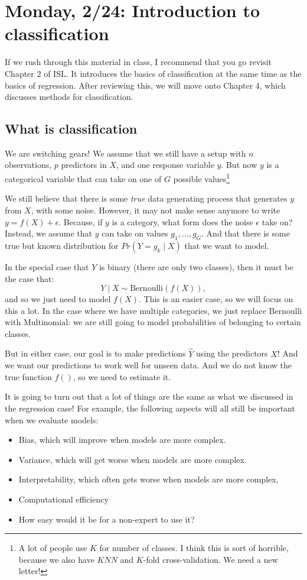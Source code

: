 \section{Monday, 2/24: Introduction to classification}

If we rush through this material in class, I recommend that you go revisit Chapter 2 of ISL. It introduces the basics of classification at the same time as the basics of regression. After reviewing this, we will move onto Chapter 4, which discusses methods for classification.

\subsection{What is classification}

We are switching gears! We assume that we still have a setup with $n$ observations, $p$ predictors in $X$, and one response variable $y$. But now $y$ is a categorical variable that can take on one of $G$ possible values\footnote{A lot of people use $K$ for number of classes. I think this is sort of horrible, because we also have $KNN$ and $K$-fold cross-validation. We need a new letter!}

We still believe that there is some \emph{true} data generating process that generates $y$ from $X$, with some noise. However, it may not make sense anymore to write $y = f(X) + \epsilon$. Because, if $y$ is a category, what form does the noise $\epsilon$ take on? Instead, we assume that $y$ can take on values $g_1,\ldots, g_G$. And that there is some true but known distribution for $Pr(Y=g_k \mid X)$ that we want to model. 

In the special case that $Y$ is binary (there are only two classes), then it must be the case that:
$$
Y \mid X \sim \mathrm{Bernoulli}(f(X)), 
$$
and so we just need to model $f(X)$. This is an easier case, so we will focus on this a lot. In the case where we have multiple categories, we just replace $\mathrm{Bernoulli}$ with $\mathrm{Multinomial}$: we are still going to model probabilities of belonging to certain classes. 

But in either case, our goal is to make predictions $\hat{Y}$ using the predictors $X$! And we want our predictions to work well for unseen data. And we do not know the true function $f()$, so we need to estimate it. 

It is going to turn out that a lot of things are the same as what we discussed in the regression case! For example, the following aspects will all still be important when we evaluate models:
\begin{itemize}
\item Bias, which will improve when models are more complex. 
\item Variance, which will get worse when models are more complex.
\item Interpretability, which often gets worse when models are more complex, 
\item Computational efficiency
\item How easy would it be for a non-expert to use it? 
\end{itemize}

